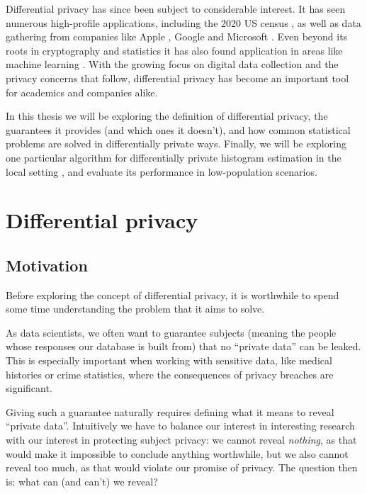 \documentclass[12pt]{article}
\begin{document}
Differential privacy has since been subject to considerable interest. It has seen numerous high-profile applications, including the 2020 US census \cite{us_census}, as well as data gathering from companies like Apple \cite{apple_differential,apple_differential_loss}, Google \cite{google_rappor,google_prochlo} and Microsoft \cite{dworketal2006,microsoft_telemetry}. Even beyond its roots in cryptography and statistics it has also found application in areas like machine learning \cite{ml_abadi,ml_shokri,ml_papernot}. With the growing focus on digital data collection and the privacy concerns that follow, differential privacy has become an important tool for academics and companies alike.

\bigskip

In this thesis we will be exploring the definition of differential privacy, the guarantees it provides (and which ones it doesn't), and how common statistical problems are solved in differentially private ways. Finally, we will be exploring one particular algorithm for differentially private histogram estimation in the local setting \cite{microsoft_telemetry}, and evaluate its performance in low-population scenarios.

\section{Differential privacy \label{sec:diffpriv}}

\subsection{Motivation \label{sec:motivation}}

Before exploring the concept of differential privacy, it is worthwhile to spend some time understanding the problem that it aims to solve. \bigskip

As data scientists, we often want to guarantee subjects (meaning the people whose responses our database is built from) that no ``private data'' can be leaked. This is especially important when working with sensitive data, like medical histories or crime statistics, where the consequences of privacy breaches are significant.

Giving such a guarantee naturally requires defining what it means to reveal ``private data''. Intuitively we have to balance our interest in interesting research with our interest in protecting subject privacy: we cannot reveal \emph{nothing}, as that would make it impossible to conclude anything worthwhile, but we also cannot reveal too much, as that would violate our promise of privacy. The question then is: what can (and can't) we reveal?
\end{document}
